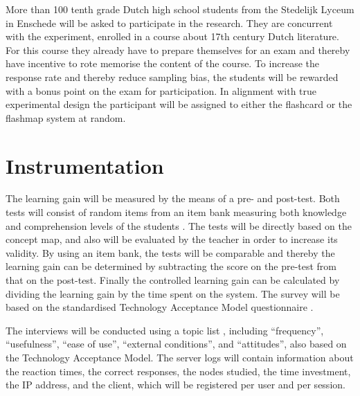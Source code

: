 

More than 100 tenth grade Dutch high school students from the Stedelijk Lyceum in Enschede will be asked to participate in the research. They are concurrent with the experiment, enrolled in a course about 17th century Dutch literature. For this course they already have to prepare themselves for an exam and thereby have incentive to rote memorise the content of the course. To increase the response rate and thereby reduce sampling bias, the students will be rewarded with a bonus point on the exam for participation. In alignment with true experimental design the participant will be assigned to either the flashcard or the flashmap system at random.

\section{Instrumentation}



The learning gain will be measured by the means of a pre- and post-test. Both tests will consist of random items from an item bank measuring both knowledge and comprehension levels of the students \cite{bloom}. The tests will be directly based on the concept map, and also will be evaluated by the teacher in order to increase its validity. By using an item bank, the tests will be comparable and thereby the learning gain can be determined by subtracting the score on the pre-test from that on the post-test. Finally the controlled learning gain can be calculated by dividing the learning gain by the time spent on the system. The survey will be based on the standardised Technology Acceptance Model questionnaire .

The interviews will be conducted using a topic list \cite{baarda}, including “frequency”, “usefulness”, “ease of use”, “external conditions”, and “attitudes”, also based on the Technology Acceptance Model. The server logs will contain information about the reaction times, the correct responses, the nodes studied, the time investment, the IP address, and the client, which will be registered per user and per session.

